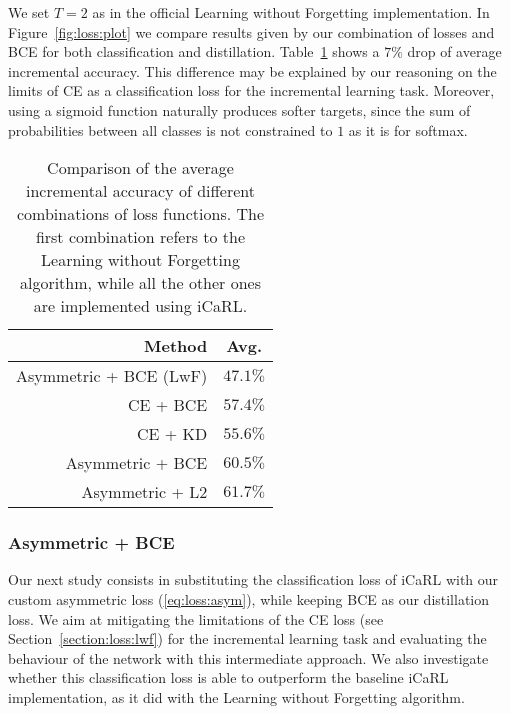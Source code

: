 \documentclass[10pt,twocolumn,letterpaper]{article}
\begin{document}
We set $T = 2$ as in the official Learning without Forgetting implementation. In Figure~\ref{fig:loss:plot} we compare results given by our combination of losses and BCE for both classification and distillation. Table~\ref{tab:loss} shows a $7\%$ drop of average incremental accuracy. This difference may be explained by our reasoning on the limits of CE as a classification loss for the incremental learning task. Moreover, using a sigmoid function naturally produces softer targets, since the sum of probabilities between all classes is not constrained to $1$ as it is for softmax.

\begin{table}
    \begin{center}
        \begin{tabular}{|r|c|}
        \hline
        Method & Avg. \\
        \hline\hline
        Asymmetric + BCE (LwF) & $47.1\%$ \\
        CE + BCE & $57.4\%$ \\
        CE + KD &  $55.6\%$ \\
        Asymmetric + BCE &  $60.5\%$ \\
        Asymmetric + L2 &  $61.7\%$ \\
        \hline
        \end{tabular}
    \end{center}
\caption{Comparison of the average incremental accuracy of different combinations of loss functions. The first combination refers to the Learning without Forgetting algorithm, while all the other ones are implemented using iCaRL.}
\label{tab:loss}
\end{table}

\subsubsection{Asymmetric + BCE}
\label{asymbce}
Our next study consists in substituting the classification loss of iCaRL with our custom asymmetric loss (\ref{eq:loss:asym}), while keeping BCE as our distillation loss. We aim at mitigating the limitations of the CE loss (see Section~\ref{section:loss:lwf}) for the incremental learning task and evaluating the behaviour of the network with this intermediate approach. We also investigate whether this classification loss is able to outperform the baseline iCaRL implementation, as it did with the Learning without Forgetting algorithm.
\end{document}
